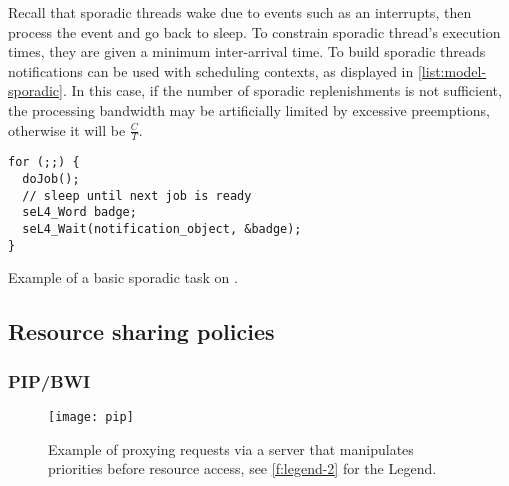 Recall that sporadic threads wake due to events such as an interrupts, then process the event and
go back to sleep. To constrain sporadic thread's execution times, they are given a minimum
inter-arrival time.
To build sporadic threads notifications can be used
with scheduling contexts, as displayed in \cref{list:model-sporadic}. In this case, if the
number of sporadic replenishments is not sufficient, the processing bandwidth may be artificially
limited by excessive preemptions, otherwise it will be $\frac{C}{T}$. 

\begin{listing}
  \begin{verbatim}
for (;;) {
  doJob();
  // sleep until next job is ready
  seL4_Word badge;
  seL4_Wait(notification_object, &badge);
}
  \end{verbatim}
  \caption{Example of a basic sporadic task on \selfour.}
  \label{list:model-sporadic}
\end{listing}

\subsection{Resource sharing policies}

\subsubsection{\gls{PIP}/\gls{BWI}}
\label{sec:model-pip-bwi}

\begin{figure}
    \centering
    \texttt{[image: pip]}
    \caption[Example of proxying requests via a server.]{Example of proxying requests via a server that manipulates priorities before resource
    access, see \cref{f:legend-2} for the Legend.}
    \label{f:model-pip}
\end{figure}
 
